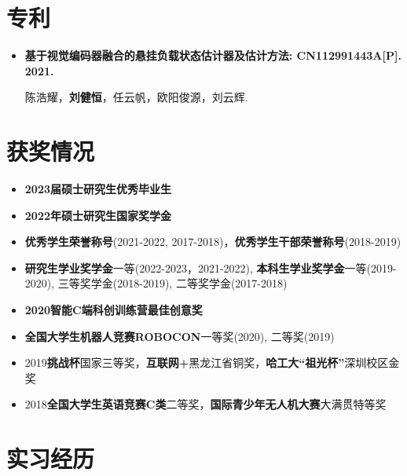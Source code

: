 \documentclass[11pt,a4paper,sans]{moderncv}        %
\begin{document}
\section{专利}

\begin{itemize}

    \item{\textbf{基于视觉编码器融合的悬挂负载状态估计器及估计方法: CN112991443A[P]. 2021.}

    \small{陈浩耀，\textbf{刘健恒}，任云帆，欧阳俊源，刘云辉.}
    }
    
\end{itemize}

\section{获奖情况}

\begin{itemize}


\item{\textbf{2023届硕士研究生优秀毕业生}}

\item{\textbf{2022年硕士研究生国家奖学金}}

\item{\textbf{优秀学生荣誉称号}(2021-2022, 2017-2018)，\textbf{优秀学生干部荣誉称号}(2018-2019)}

\item{\textbf{研究生学业奖学金}一等(2022-2023，2021-2022), \textbf{本科生学业奖学金}一等(2019-2020), 三等奖学金(2018-2019), 二等奖学金(2017-2018)}

\item{\textbf{2020智能C端科创训练营最佳创意奖}}

\item{\textbf{全国大学生机器人竞赛ROBOCON}一等奖(2020), 二等奖(2019)}

\item{2019\textbf{挑战杯}国家三等奖，\textbf{互联网+}黑龙江省铜奖，\textbf{哈工大“祖光杯”}深圳校区金奖}

\item{2018\textbf{全国大学生英语竞赛C类}二等奖，\textbf{国际青少年无人机大赛}大满贯特等奖}

\end{itemize}

\section{实习经历}
\end{document}

